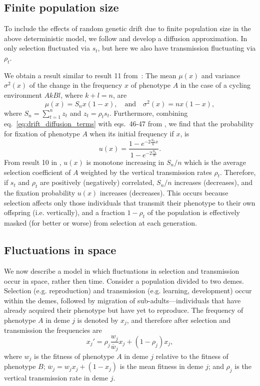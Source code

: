 \documentclass[14pt]{extarticle}
\begin{document}
\subsection*{Finite population size}

To include the effects of random genetic drift due to finite population size in the above deterministic model, we follow \citet{Ram2018} and develop a diffusion  approximation.
In~\citet{Ram2018} only selection fluctuated via $s_t$, but here we also have transmission fluctuating via $\rho_t$. 

We obtain a result similar to result 11 from~\citet{Ram2018}:
The mean $\mu(x)$ and variance $\sigma^2(x)$ of the change in the frequency $x$ of phenotype $A$ in the case of a cycling environment $AkBl$, where $k+l=n$, are
\begin{equation} \label{eq:drift_diffusion_terms}
\mu(x) = S_n x(1-x),
\quad \text{and} \quad
\sigma^2(x) = n x (1-x),
\end{equation}
where $S_n = \sum_{t=1}^{n}{z_t}$ and $z_t = \rho_t s_t$.
Furthermore, combining eq.~\ref{eq:drift_diffusion_terms} with eqs.~46-47 from \citet{Ram2018}, we find that the probability for fixation of phenotype $A$ when its initial frequency if $x$, is
\begin{equation}
u(x) = \frac{1 - e^{-2 \frac{S_n}{n} x}}{1 - e^{-2 \frac{S_n}{n}}}.
\end{equation}
From result 10 in \citet{Ram2018}, $u(x)$ is monotone increasing in $S_n/n$ which is the average selection coefficient of $A$ weighted by the vertical transmission rates $\rho_t$.
Therefore, if $s_t$ and $\rho_t$ are positively (negatively) correlated, $S_n/n$ increases (decreases), and the fixation probability $u(x)$ increases (decreases). 
This occurs because selection  affects only those individuals that transmit their phenotype to their own offspring (i.e. vertically), and a fraction $1-\rho_t$ of the population is effectively masked (for better or worse) from selection at each generation.

\subsection*{Fluctuations in space}

We now describe a model in which fluctuations in selection and transmission occur in space, rather then time.
Consider a population divided to two demes.
Selection (e.g. reproduction) and transmission (e.g. learning, development) occur within the demes, followed by migration of sub-adults---individuals that have already acquired their phenotype but have yet to reproduce.
The frequency of phenotype $A$ in deme $j$ is denoted by $x_j$, and therefore after selection and transmission the frequencies are 
\begin{equation} \label{eq:migration_model_selection_transmission}
x_j' = \rho_j \frac{w_j}{\overline{w}_j} x_j + (1-\rho_j) x_j,
\end{equation}
where $w_j$ is the fitness of phenotype $A$ in deme $j$ relative to the fitness of phenotype $B$; $\overline{w}_j=w_j x_j + (1-x_j)$ is the mean fitness in deme $j$; and $\rho_j$ is the vertical transmission rate in deme $j$.
\end{document}
